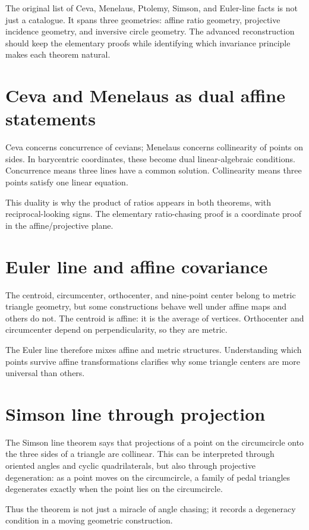 The original list of Ceva, Menelaus, Ptolemy, Simson, and Euler-line facts is not just a catalogue.  It spans three geometries: affine ratio geometry, projective incidence geometry, and inversive circle geometry.  The advanced reconstruction should keep the elementary proofs while identifying which invariance principle makes each theorem natural.

\section{Ceva and Menelaus as dual affine statements}

Ceva concerns concurrence of cevians; Menelaus concerns collinearity of points on sides.  In barycentric coordinates, these become dual linear-algebraic conditions.  Concurrence means three lines have a common solution.  Collinearity means three points satisfy one linear equation.

This duality is why the product of ratios appears in both theorems, with reciprocal-looking signs.  The elementary ratio-chasing proof is a coordinate proof in the affine\-/projective plane.

\section{Euler line and affine covariance}

The centroid, circumcenter, orthocenter, and nine-point center belong to metric triangle geometry, but some constructions behave well under affine maps and others do not.  The centroid is affine: it is the average of vertices.  Orthocenter and circumcenter depend on perpendicularity, so they are metric.

The Euler line therefore mixes affine and metric structures.  Understanding which points survive affine transformations clarifies why some triangle centers are more universal than others.

\section{Simson line through projection}

The Simson line theorem says that projections of a point on the circumcircle onto the three sides of a triangle are collinear.  This can be interpreted through oriented angles and cyclic quadrilaterals, but also through projective degeneration: as a point moves on the circumcircle, a family of pedal triangles degenerates exactly when the point lies on the circumcircle.

Thus the theorem is not just a miracle of angle chasing; it records a degeneracy condition in a moving geometric construction.
